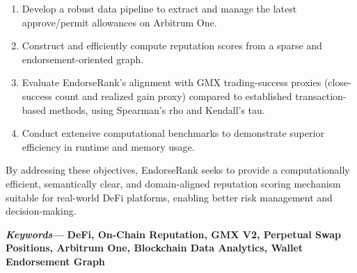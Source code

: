 \begin{enumerate}
\item[1.] Develop a robust data pipeline to extract and manage the latest approve/permit allowances on Arbitrum One.
\item[2.] Construct and efficiently compute reputation scores from a sparse and endorsement-oriented graph.
\item[3.] Evaluate EndorseRank's alignment with GMX trading-success proxies (close-success count and realized gain proxy) compared to established transaction-based methods, using Spearman's rho and Kendall's tau.
\item[4.] Conduct extensive computational benchmarks to demonstrate superior efficiency in runtime and memory usage.
\end{enumerate}
By addressing these objectives, EndorseRank seeks to provide a computationally efficient, semantically clear, and domain-aligned reputation scoring mechanism suitable for real-world DeFi platforms, enabling better risk management and decision-making.


\textbf{\emph{Keywords--- }}\textbf{DeFi, On-Chain Reputation, GMX V2, Perpetual Swap Positions, Arbitrum One, Blockchain Data Analytics, Wallet Endorsement Graph}
